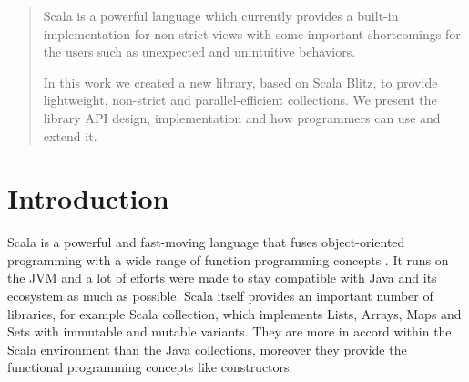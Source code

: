 \documentclass[a4paper,12pt,twocolumn]{article}
\begin{document}
\begin{abstract}
Scala is a powerful language which currently provides a built-in implementation for non-strict views with some important shortcomings for the users such as unexpected and unintuitive behaviors.

In this work we created a new library, based on Scala Blitz, to provide lightweight, non-strict and parallel-efficient collections.
We present the library API design, implementation and how programmers can use and extend it.
\end{abstract}

\section{Introduction}
Scala is a powerful and fast-moving language that fuses object-oriented programming with a wide range of function programming concepts \cite{scala-overview}.
It runs on the JVM and a lot of efforts were made to stay compatible with Java and its ecosystem as much as possible.
Scala itself provides an important number of libraries, for example Scala collection, which implements Lists, Arrays, Maps and Sets with immutable and mutable variants.
They are more in accord within the Scala environment than the Java collections, moreover they provide the functional programming concepts like constructors.
\end{document}
